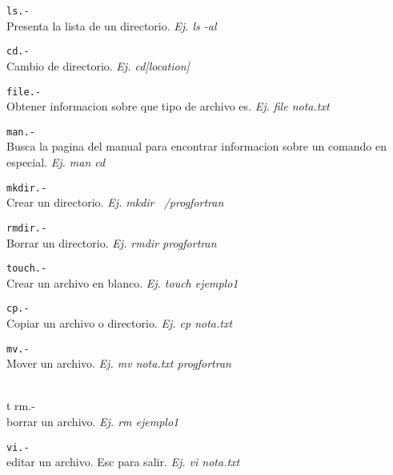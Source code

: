\documentclass[12pt]{article}
\begin{document}
 \begin{enumerate}
 
 
 \bigskip
 \hline
 \hline
 
 
 \vspace \item {\tt ls.-}\\{Presenta la lista de un directorio. \textit{Ej. ls -al}} \\ \hline
 \vspace \item {\tt cd.-}\\{Cambio de directorio. \textit{Ej. cd[location]}}\\ \hline
 \vspace \item {\tt file.-}\\{Obtener informacion sobre que tipo de archivo es. \textit{Ej.  file nota.txt}} \\ \hline
 \vspace \item {{\tt man.-}\\{Busca la pagina del manual para encontrar informacion sobre un comando en especial. \textit{Ej. man cd} }\\ \hline
 \vspace \item {\tt mkdir.-}\\{Crear un directorio. \textit{Ej. mkdir ~/progfortran}} \\ \hline
 \vspace \item {\tt rmdir.-}  \\{Borrar un directorio. \textit{Ej. rmdir progfortran}}\\ \hline
 \vspace \item {\tt touch.-}  \\{Crear un archivo en blanco. \textit{Ej. touch ejemplo1}} \\ \hline
 \vspace \item {\tt cp.-}  \\{Copiar un archivo o directorio. \textit{Ej. cp nota.txt}}\ \hline
 \vspace \item {\tt mv.-}  \\{Mover un archivo. \textit{Ej. mv nota.txt progfortran}}\\ \hline
 \vspace \item {\\t rm.-}  \\{borrar un archivo. \textit{Ej. rm ejemplo1}}\\ \hline
 \vspace \item {\tt vi.-} \\{editar un archivo. Esc para salir. \textit{Ej. vi nota.txt}} \\ \hline
}
\end{enumerate}
\end{document}
